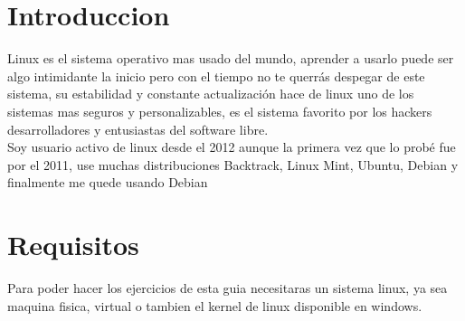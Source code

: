 \section*{Introduccion}
Linux es el sistema operativo mas usado del mundo, aprender a usarlo puede ser algo intimidante la inicio pero con el tiempo no te querrás despegar de este sistema, su estabilidad y constante actualización hace de linux uno de los sistemas mas seguros y personalizables, es el sistema favorito por los hackers desarrolladores y entusiastas del software libre.
\\
Soy usuario activo de linux desde el 2012 aunque la primera vez que lo probé fue por el
2011, use muchas distribuciones Backtrack, Linux Mint, Ubuntu, Debian y finalmente me
quede usando Debian
\section*{Requisitos}
Para poder hacer los ejercicios de esta guia necesitaras un sistema linux, ya sea
maquina fisica, virtual o tambien el kernel de linux disponible en windows.
